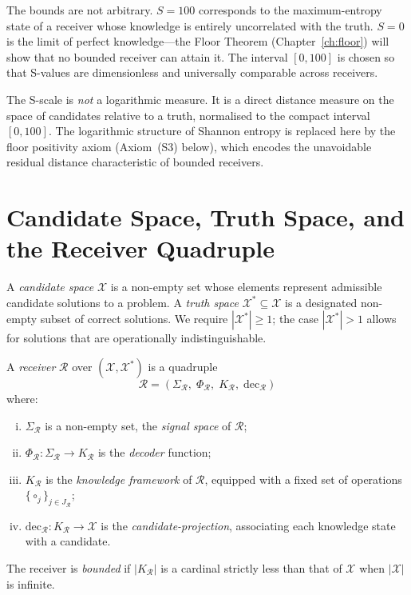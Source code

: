 The bounds are not arbitrary.  $S = 100$ corresponds to the maximum-entropy
state of a receiver whose knowledge is entirely uncorrelated with the truth.
$S = 0$ is the limit of perfect knowledge---the Floor Theorem
(Chapter~\ref{ch:floor}) will show that no bounded receiver can attain it.
The interval $[0,100]$ is chosen so that S-values are dimensionless and
universally comparable across receivers.

\begin{remark}
The S-scale is \emph{not} a logarithmic measure.  It is a direct distance
measure on the space of candidates relative to a truth, normalised to the
compact interval $[0,100]$.  The logarithmic structure of Shannon entropy is
replaced here by the floor positivity axiom (Axiom~(S3) below), which encodes
the unavoidable residual distance characteristic of bounded receivers.
\end{remark}

\section{Candidate Space, Truth Space, and the Receiver Quadruple}
\label{sec:ch13-receiver}

\begin{definition}\label{def:cand-truth-mono}
A \emph{candidate space} $\mathcal{X}$ is a non-empty set whose elements
represent admissible candidate solutions to a problem.  A
\emph{truth space} $\mathcal{X}^{*} \subseteq \mathcal{X}$ is a designated
non-empty subset of correct solutions.  We require $|\mathcal{X}^{*}| \geq 1$;
the case $|\mathcal{X}^{*}| > 1$ allows for solutions that are operationally
indistinguishable.
\end{definition}

\begin{definition}[Receiver]\label{def:receiver-mono}
A \emph{receiver} $\mathcal{R}$ over $(\mathcal{X}, \mathcal{X}^{*})$ is a
quadruple
\[
  \mathcal{R} = (\Sigma_{\mathcal{R}},\; \Phi_{\mathcal{R}},\;
                 K_{\mathcal{R}},\; \mathrm{dec}_{\mathcal{R}})
\]
where:
\begin{enumerate}[(i)]
  \item $\Sigma_{\mathcal{R}}$ is a non-empty set, the \emph{signal space} of
    $\mathcal{R}$;
  \item $\Phi_{\mathcal{R}} : \Sigma_{\mathcal{R}} \to K_{\mathcal{R}}$
    is the \emph{decoder} function;
  \item $K_{\mathcal{R}}$ is the \emph{knowledge framework} of $\mathcal{R}$,
    equipped with a fixed set of operations
    $\{\circ_j\}_{j \in J_{\mathcal{R}}}$;
  \item $\mathrm{dec}_{\mathcal{R}} : K_{\mathcal{R}} \to \mathcal{X}$ is the
    \emph{candidate-projection}, associating each knowledge state with a
    candidate.
\end{enumerate}
The receiver is \emph{bounded} if $|K_{\mathcal{R}}|$ is a cardinal strictly
less than that of $\mathcal{X}$ when $|\mathcal{X}|$ is infinite.
\end{definition}

